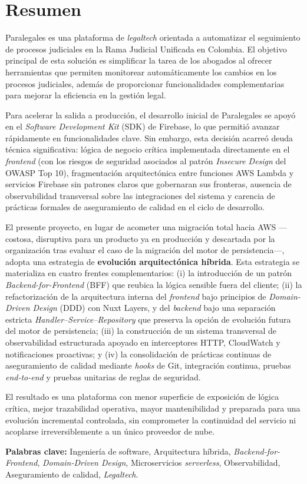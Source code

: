 \section*{Resumen}

Paralegales es una plataforma de \textit{legaltech} orientada a automatizar el seguimiento de procesos judiciales en la Rama Judicial Unificada en Colombia. El objetivo principal de esta solución es simplificar la tarea de los abogados al ofrecer herramientas que permiten monitorear automáticamente los cambios en los procesos judiciales, además de proporcionar funcionalidades complementarias para mejorar la eficiencia en la gestión legal.

Para acelerar la salida a producción, el desarrollo inicial de Paralegales se apoyó en el \textit{Software Development Kit} (SDK) de Firebase, lo que permitió avanzar rápidamente en funcionalidades clave. Sin embargo, esta decisión acarreó deuda técnica significativa: lógica de negocio crítica implementada directamente en el \textit{frontend} (con los riesgos de seguridad asociados al patrón \textit{Insecure Design} del OWASP Top 10), fragmentación arquitectónica entre funciones AWS Lambda y servicios Firebase sin patrones claros que gobernaran sus fronteras, ausencia de observabilidad transversal sobre las integraciones del sistema y carencia de prácticas formales de aseguramiento de calidad en el ciclo de desarrollo.

El presente proyecto, en lugar de acometer una migración total hacia AWS —costosa, disruptiva para un producto ya en producción y descartada por la organización tras evaluar el caso de la migración del motor de persistencia—, adopta una estrategia de \textbf{evolución arquitectónica híbrida}. Esta estrategia se materializa en cuatro frentes complementarios: (i) la introducción de un patrón \textit{Backend-for-Frontend} (BFF) que reubica la lógica sensible fuera del cliente; (ii) la refactorización de la arquitectura interna del \textit{frontend} bajo principios de \textit{Domain-Driven Design} (DDD) con Nuxt Layers, y del \textit{backend} bajo una separación estricta \textit{Handler--Service--Repository} que preserva la opción de evolución futura del motor de persistencia; (iii) la construcción de un sistema transversal de observabilidad estructurada apoyado en interceptores HTTP, CloudWatch y notificaciones proactivas; y (iv) la consolidación de prácticas continuas de aseguramiento de calidad mediante \textit{hooks} de Git, integración continua, pruebas \textit{end-to-end} y pruebas unitarias de reglas de seguridad.

El resultado es una plataforma con menor superficie de exposición de lógica crítica, mejor trazabilidad operativa, mayor mantenibilidad y preparada para una evolución incremental controlada, sin comprometer la continuidad del servicio ni acoplarse irreversiblemente a un único proveedor de nube.

\hfill

\textbf{Palabras clave:} Ingeniería de software, Arquitectura híbrida, \textit{Backend-for-Frontend}, \textit{Domain-Driven Design}, Microservicios \textit{serverless}, Observabilidad, Aseguramiento de calidad, \textit{Legaltech}.
